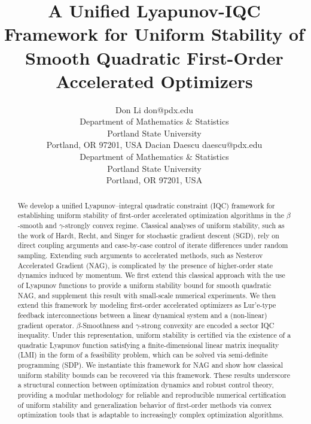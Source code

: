 \documentclass[twoside,11pt]{article}
\begin{document}
\title{A Unified Lyapunov-IQC Framework for Uniform Stability of Smooth Quadratic First-Order Accelerated Optimizers}

\author{\name Don Li \email don@pdx.edu \\
       \addr Department of Mathematics \& Statistics\\
       Portland State University \\
       Portland, OR 97201, USA
       \AND
       \name Dacian Daescu \email daescu@pdx.edu \\
       \addr Department of Mathematics \& Statistics \\
       Portland State University \\
       Portland, OR 97201, USA}


\maketitle

\begin{abstract}
We develop a unified Lyapunov--integral quadratic constraint (IQC) framework for establishing uniform stability of first-order accelerated optimization algorithms in the $\beta$-smooth and $\gamma$-strongly convex regime. Classical analyses of uniform stability, such as the work of Hardt, Recht, and Singer for stochastic gradient descent (SGD), rely on direct coupling arguments and case-by-case control of iterate differences under random sampling. Extending such arguments to accelerated methods, such as Nesterov Accelerated Gradient (NAG), is complicated by the presence of higher-order state dynamics induced by momentum. We first extend this classical approach with the use of Lyapunov functions to provide a uniform stability bound for smooth quadratic NAG, and supplement this result with small-scale numerical experiments. We then extend this framework by modeling first-order accelerated optimizers as Lur’e-type feedback interconnections between a linear dynamical system and a (non-linear) gradient operator. $\beta$-Smoothness and $\gamma$-strong convexity are encoded a sector IQC inequality. Under this representation, uniform stability is certified via the existence of a quadratic Lyapunov function satisfying a finite-dimensional linear matrix inequality (LMI) in the form of a feasibility problem, which can be solved via semi-definite programming (SDP). We instantiate this framework for NAG and show how classical uniform stability bounds can be recovered via this framework. These results underscore a structural connection between optimization dynamics and robust control theory, providing a modular methodology for reliable and reproducible numerical certification of uniform stability and generalization behavior of first-order methods via convex optimization tools that is adaptable to increasingly complex optimization algorithms.
\end{abstract}
\end{document}
